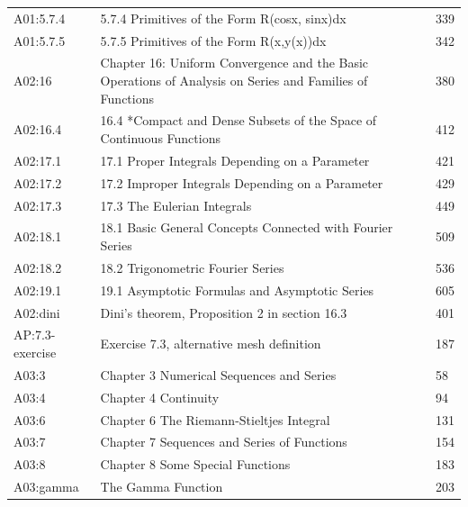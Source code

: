 \documentclass[11pt,oneside,a4paper]{book}
\theoremstyle{definition}
\theoremstyle{remark}
\begin{document}
\begin{longtable}{p{22mm}p{99mm}p{20mm}}
A01:5.7.4 & 5.7.4 Primitives of the Form R(cosx, sinx)dx & 339 \\

A01:5.7.5 & 5.7.5 Primitives of the Form R(x,y(x))dx & 342 \\

A02:16 & Chapter 16: Uniform Convergence and the Basic Operations of Analysis on Series and Families of Functions & 380 \\

A02:16.4 & 16.4 *Compact and Dense Subsets of the Space of Continuous Functions & 412 \\

A02:17.1 & 17.1 Proper Integrals Depending on a Parameter & 421 \\

A02:17.2 & 17.2 Improper Integrals Depending on a Parameter & 429 \\

A02:17.3 & 17.3 The Eulerian Integrals & 449 \\

A02:18.1 & 18.1 Basic General Concepts Connected with Fourier Series & 509 \\

A02:18.2 & 18.2 Trigonometric Fourier Series & 536 \\

A02:19.1 & 19.1 Asymptotic Formulas and Asymptotic Series & 605 \\

A02:dini & Dini's theorem, Proposition 2 in section 16.3 & 401 \\

AP:7.3-exercise & Exercise 7.3, alternative mesh definition & 187 \\

A03:3 & Chapter 3 Numerical Sequences and Series & 58 \\

A03:4 & Chapter 4 Continuity & 94 \\

A03:6 & Chapter 6 The Riemann-Stieltjes Integral & 131 \\

A03:7 & Chapter 7 Sequences and Series of Functions & 154 \\

A03:8 & Chapter 8 Some Special Functions & 183 \\

A03:gamma & The Gamma Function & 203 \\


\end{longtable}
\end{document}
